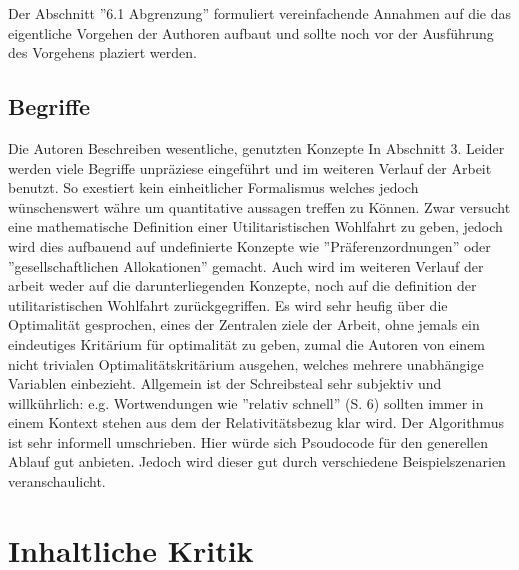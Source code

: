 \documentclass[sigconf]{acmart}
\theoremstyle{break}
\begin{document}
Der Abschnitt ''6.1 Abgrenzung'' formuliert vereinfachende Annahmen auf die das eigentliche Vorgehen der Authoren aufbaut und sollte noch vor der Ausführung des Vorgehens plaziert werden.


\subsection*{Begriffe}
Die Autoren Beschreiben wesentliche, genutzten Konzepte In Abschnitt 3. Leider werden viele Begriffe unpräziese eingeführt und im weiteren Verlauf der Arbeit benutzt.
So exestiert kein einheitlicher Formalismus welches jedoch wünschenswert währe um quantitative aussagen treffen zu Können.
Zwar versucht eine mathematische Definition einer Utilitaristischen Wohlfahrt zu geben,
jedoch wird dies aufbauend auf undefinierte Konzepte
wie ''Präferenzordnungen'' oder ''gesellschaftlichen Allokationen'' gemacht.
Auch wird im weiteren Verlauf der arbeit weder auf die darunterliegenden Konzepte, noch auf die definition der utilitaristischen Wohlfahrt zurückgegriffen.
Es wird sehr heufig über die Optimalität gesprochen, eines der Zentralen ziele der Arbeit, ohne jemals ein eindeutiges Kritärium für optimalität zu geben,
zumal die Autoren von einem nicht trivialen Optimalitätskritärium ausgehen, welches mehrere unabhängige Variablen einbezieht.
Allgemein ist der Schreibsteal sehr subjektiv und willkührlich: e.g. Wortwendungen wie ''relativ schnell'' (S. 6) sollten immer in einem Kontext stehen aus dem der Relativitätsbezug klar wird.
Der Algorithmus ist sehr informell umschrieben. Hier würde sich Psoudocode für den generellen Ablauf gut anbieten. Jedoch wird dieser gut durch verschiedene Beispielszenarien veranschaulicht.







\section{Inhaltliche Kritik}
\label{sec:ik}
\end{document}
